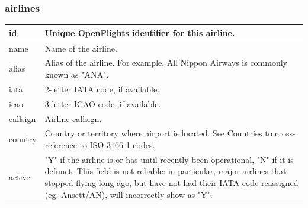 \documentclass[12pt]{article}
\begin{document}
\subsubsection{airlines}
\label{sec:org2e81a69}
\begin{center}
\begin{tabular}{p{2cm}|p{11cm}}
id & Unique OpenFlights identifier for this airline.\\[0pt]
  \hline
name & Name of the airline.\\[0pt]
  \hline
alias & Alias of the airline. For example, All Nippon Airways is commonly known as "ANA".\\[0pt]
  \hline
iata & 2-letter IATA code, if available.\\[0pt]
  \hline
icao & 3-letter ICAO code, if available.\\[0pt]
  \hline
callsign & Airline callsign.\\[0pt]
  \hline
country & Country or territory where airport is located. See Countries to cross-reference to ISO 3166-1 codes.\\[0pt]
  \hline
active & "Y" if the airline is or has until recently been operational, "N" if it is defunct. This field is not reliable: in particular, major airlines that stopped flying long ago, but have not had their IATA code reassigned (eg. Ansett/AN), will incorrectly show as "Y".\\[0pt]
\end{tabular}
\end{center}
\end{document}
